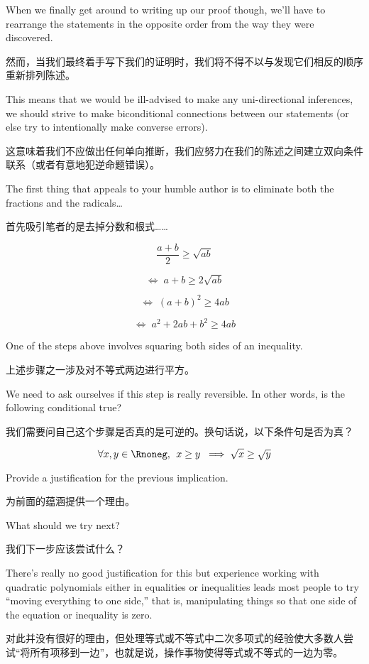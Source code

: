 When we finally get around to writing up
our proof though, we'll have to rearrange the statements in the opposite
order from the way they were discovered.

然而，当我们最终着手写下我们的证明时，我们将不得不以与发现它们相反的顺序重新排列陈述。

This means that we would
be ill-advised to make any uni-directional inferences, we should
strive to make biconditional connections between our statements
(or else try to intentionally make converse errors).

这意味着我们不应做出任何单向推断，我们应努力在我们的陈述之间建立双向条件联系（或者有意地犯逆命题错误）。

The first thing that appeals to your humble author is to eliminate
both the fractions and the radicals\ldots

首先吸引笔者的是去掉分数和根式……

\[ \frac{a+b}{2} \geq \sqrt{ab} \]

\[ \iff \; a+b \geq 2\sqrt{ab} \]

\[ \iff \; (a+b)^2 \geq 4ab \]

\[ \iff \; a^2+2ab+b^2 \geq 4ab \]

One of the steps above involves squaring both sides of an inequality.

上述步骤之一涉及对不等式两边进行平方。

We need to ask ourselves if this step is really reversible.  In other
words, is the following conditional true?

我们需要问自己这个步骤是否真的是可逆的。换句话说，以下条件句是否为真？

\[ \forall x,y \in \Rnoneg, \, \;
      x \geq y \; \implies \sqrt{x} \geq \sqrt{y} \]

\begin{exer}
      Provide a justification for the previous implication.

      为前面的蕴涵提供一个理由。
\end{exer}

What should we try next?

我们下一步应该尝试什么？

There's really no good justification for
this but experience working with quadratic polynomials either in
equalities or inequalities leads most people to try ``moving everything
to one side,'' that is, manipulating things so that one side of the
equation or inequality is zero.

对此并没有很好的理由，但处理等式或不等式中二次多项式的经验使大多数人尝试“将所有项移到一边”，也就是说，操作事物使得等式或不等式的一边为零。

